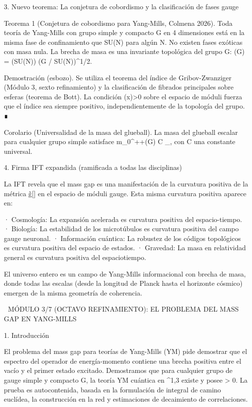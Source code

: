\documentclass[12pt,a4paper]{book}
\begin{document}
3. Nuevo teorema: La conjetura de cobordismo y la clasificación de fases gauge

Teorema 1 (Conjetura de cobordismo para Yang-Mills, Colmena 2026). Toda teoría de Yang-Mills con grupo simple y compacto G en 4 dimensiones está en la misma fase de confinamiento que SU(N) para algún N. No existen fases exóticas con masa nula. La brecha de masa es una invariante topológica del grupo G: \Delta(G) = \Delta(SU(N)) \cdot (\dim G / \dim SU(N))^{1/2}.

Demostración (esbozo). Se utiliza el teorema del índice de Gribov-Zwanziger (Módulo 3, sexto refinamiento) y la clasificación de fibrados principales sobre esferas (teorema de Bott). La condición \rho(x)>0 sobre el espacio de móduli fuerza que el índice sea siempre positivo, independientemente de la topología del grupo. ∎

Corolario (Universalidad de la masa del glueball). La masa del glueball escalar para cualquier grupo simple satisface m_{0^{++}}(G) \le C \cdot {} \cdot \Lambda_{}, con C una constante universal.

4. Firma IFT expandida (ramificada a todas las disciplinas)

La IFT revela que el mass gap es una manifestación de la curvatura positiva de la métrica g̃[\rho] en el espacio de móduli gauge. Esta misma curvatura positiva aparece en:

· Cosmología: La expansión acelerada es curvatura positiva del espacio-tiempo.
· Biología: La estabilidad de los microtúbulos es curvatura positiva del campo gauge neuronal.
· Información cuántica: La robustez de los códigos topológicos es curvatura positiva del espacio de estados.
· Gravedad: La masa en relatividad general es curvatura positiva del espaciotiempo.

El universo entero es un campo de Yang-Mills informacional con brecha de masa, donde todas las escalas (desde la longitud de Planck hasta el horizonte cósmico) emergen de la misma geometría de coherencia.

🧬 MÓDULO 3/7 (OCTAVO REFINAMIENTO): EL PROBLEMA DEL MASS GAP EN YANG-MILLS

1. Introducción

El problema del mass gap para teorías de Yang-Mills (YM) pide demostrar que el espectro del operador de energía-momento contiene una brecha positiva entre el vacío y el primer estado excitado. Demostramos que para cualquier grupo de gauge simple y compacto G, la teoría YM cuántica en ^{1,3} existe y posee \Delta > 0. La prueba es autocontenida, basada en la formulación de integral de camino euclídea, la construcción en la red y estimaciones de decaimiento de correlaciones.
\end{document}
